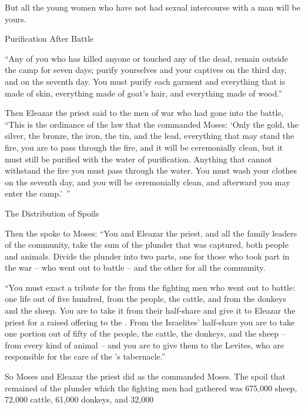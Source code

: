 {But all
the young
women
who
have not
had sexual intercourse
with a man
will be yours.
\par }{\SH Purification After Battle
\par }{\PP {}“Any
of you
who has killed
anyone or touched
any
of the dead,
remain
outside
the camp
for seven
days;
purify
yourselves
and your captives
on
the third
day,
and on
the seventh
day.
You must purify
each garment
and everything
that is made
of skin,
everything
made
of goat’s
hair, and everything
made
of wood.”
\par }{\PP {}Then Eleazar
the priest
said
to
the men
of war
who had gone
into the battle,
“This
is the ordinance
of the law
that
the
{}
commanded
Moses:
‘Only
the gold,
the silver,
the bronze,
the iron,
the tin,
and the
lead,
everything
that
may stand
the fire,
you are to pass through
the fire,
and it will be ceremonially clean,
but
it must still be purified
with the water
of purification.
Anything
that
cannot
withstand
the fire
you must pass through
the water.
You must wash
your clothes
on
the seventh
day,
and you will be ceremonially clean,
and afterward
you may enter
the camp.’ ”
\par }{\SH The Distribution of Spoils
\par }{\PP {}Then the
{}
spoke
to Moses:
“You
and Eleazar
the priest,
and all the family
leaders
of the community,
take
the sum
of the plunder
that was captured,
both people
and animals.
Divide
the
plunder
into two parts,
one for those who took
part in the war
– who went out
to battle
– and the other for all
the community.
\par }{\PP {}“You must exact
a tribute
for the
{}
from the fighting
men
who went out
to battle: one
life
out of five
hundred,
from
the people,
the cattle,
and from
the donkeys
and the sheep.
You are to take
it from their half-share
and give
it to Eleazar
the priest
for a raised
offering to the
{}.
From the Israelites’
half-share
you are to take
one
portion
out of
fifty
of the people,
the cattle,
the donkeys,
and the sheep
– from
every
kind of animal
– and you are to give
them to the Levites,
who are responsible
for the care
of the
{}’s
tabernacle.”
\par }{\PP {}So
Moses
and Eleazar
the priest
did as
the {}
commanded
Moses.
The spoil
that remained
of the plunder
which
the fighting
men
had gathered
was 675,000
sheep,
72,000
cattle,
61,000
donkeys,
and 32,000
}
